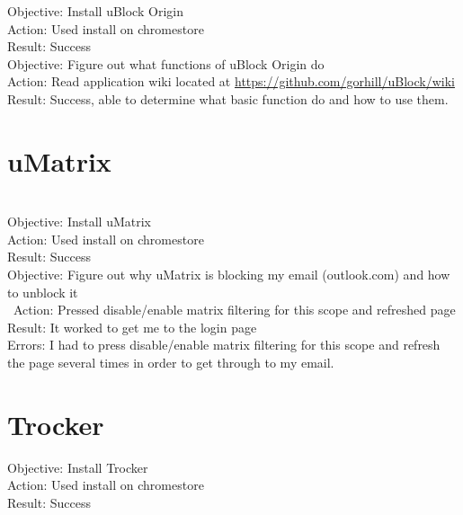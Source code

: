 \documentclass{article}
\begin{document}
Objective: Install uBlock Origin\\
Action: Used install on chromestore\\
Result: Success\\

Objective: Figure out what functions of uBlock Origin do\\
Action: Read application wiki located at \href{https://github.com/gorhill/uBlock/wiki}{https://github.com/gorhill/uBlock/wiki} 
Result: Success, able to determine what basic function do and how to use them.

\section{uMatrix}\\
Objective: Install uMatrix \\
Action: Used install on chromestore\\
Result: Success\\

Objective: Figure out why uMatrix is blocking my email (outlook.com) and how to unblock it\\\
Action: Pressed disable/enable matrix filtering for this scope and refreshed page\\
Result: It worked to get me to the login page\\
Errors: I had to press disable/enable matrix filtering for this scope and refresh the page several times in order to get through to my email. \\

\section{Trocker}
Objective: Install Trocker \\
Action: Used install on chromestore\\
Result: Success\\
\end{document}
